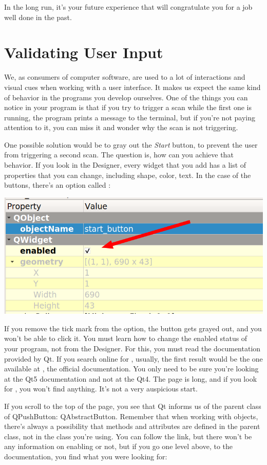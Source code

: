 In the long run, it's your future experience that will congratulate you for a job well done in the past.

\section{Validating User Input}\label{sec:validating-user-input}
We, as consumers of computer software, are used to a lot of interactions and visual cues when working with a user interface. It makes us expect the same kind of behavior in the programs you develop ourselves. One of the things you can notice in your program is that if you try to trigger a scan while the first one is running, the program prints a message to the terminal, but if you're not paying attention to it, you can miss it and wonder why the scan is not triggering.

One possible solution would be to gray out the \emph{Start} button, to prevent the user from triggering a second scan. The question is, how can you achieve that behavior. If you look in the Designer, every widget that you add has a list of properties that you can change, including shape, color, text. In the case of the buttons, there's an option called :

\begin{center}
    \includegraphics[width=.4\linewidth]{images/Chapter_09/10_enabled_button.png}
\end{center}

If you remove the tick mark from the option, the button gets grayed out, and you won't be able to click it. You must learn how to change the enabled status of your program, not from the Designer. For this, you must read the documentation provided by Qt. If you search online for , usually, the first result would be the one available at , the official documentation. You only need to be sure you're looking at the Qt5 documentation and not at the Qt4. The page is long, and if you look for , you won't find anything. It's not a very auspicious start.

If you scroll to the top of the page, you see that Qt informs us of the parent class of QPushButton: QAbstractButton. Remember that when working with objects, there's always a possibility that methods and attributes are defined in the parent class, not in the class you're using. You can follow the link, but there won't be any information on enabling or not, but if you go one level above, to the  documentation, you find what you were looking for:

